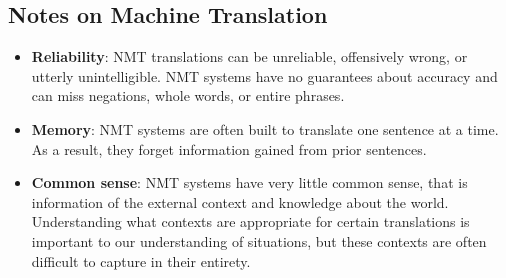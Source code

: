 \documentclass[11pt]{article}
\begin{document}
\subsection{Notes on Machine Translation}
\begin{itemize}
	\item \textbf{Reliability}: NMT translations can be unreliable, offensively wrong, or utterly unintelligible. NMT systems have no guarantees about accuracy and can miss negations, whole words, or entire phrases.
	\item \textbf{Memory}: NMT systems are often built to translate one sentence at a time. As a result, they forget information gained from prior sentences.
	\item \textbf{Common sense}: NMT systems have very little common sense, that is information of the external context and knowledge about the world. Understanding what contexts are appropriate for certain translations is important to our understanding of situations, but these contexts are often difficult to capture in their entirety.
\end{itemize}
\end{document}
